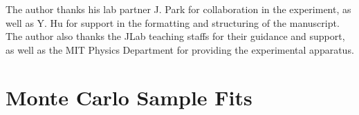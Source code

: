 \documentclass[aps,twocolumn,secnumarabic,balancelastpage,amsmath,amssymb,nofootinbib,floatfix]{revtex4-1}
\begin{document}
\begin{acknowledgments}

The author thanks his lab partner J. Park for collaboration in the experiment, as well as Y. Hu for support in the formatting and structuring of the manuscript. The author also thanks the JLab teaching staffs for their guidance and support, as well as the MIT Physics Department for providing the experimental apparatus.

\end{acknowledgments}





\appendix

\section{Monte Carlo Sample Fits}
\label{app:MC_fitting}
\end{document}
